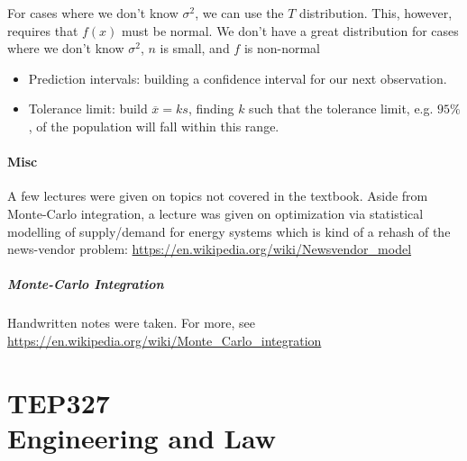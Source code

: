 \documentclass[10pt]{article}
\begin{document}
For cases where we don't know $ \sigma^2 $, we can use the $ T $ distribution. 
This, however, requires that $ f(x) $  must be normal.
We don't have a great distribution for cases where we don't know $ \sigma^2 $, $ n $ is small, and $ f $ is non-normal


\begin{itemize}
	\item Prediction intervals: building a confidence interval for our next observation.
	\item Tolerance limit: build $ \overline{x} = ks$, finding $ k $ such that the tolerance limit, e.g. $ 95\% $, of the population will fall within this range.
\end{itemize}

\subsection{Misc}

A few lectures were given on topics not covered in the textbook.
Aside from Monte-Carlo integration, a lecture was given on optimization via statistical modelling of supply/demand for energy systems which is kind of a rehash of the news-vendor problem: \url{https://en.wikipedia.org/wiki/Newsvendor_model}

\subsubsection{Monte-Carlo Integration}
\begin{blockquote}
	Handwritten notes were taken. For more, see \url{https://en.wikipedia.org/wiki/Monte_Carlo_integration}
\end{blockquote}


























\newpage
\part{TEP327\texorpdfstring{\\}.Engineering and Law}
\end{document}
